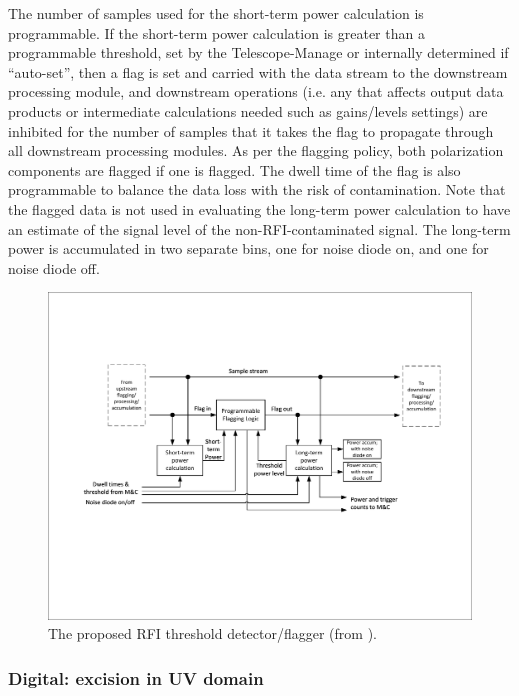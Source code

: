 The number of samples used for the short-term power calculation is programmable. If the short-term power calculation is greater than a programmable threshold, set by the Telescope-Manage or internally determined if ``auto-set'', then a flag is set and carried with the data stream to the downstream processing module, and downstream operations (i.e. any that affects output data products or intermediate calculations needed such as gains/levels settings) are inhibited for the number of samples that it takes the flag to propagate through all downstream processing modules. As per the flagging policy, both polarization components are flagged if one is flagged. The dwell time of the flag is also programmable to balance the data loss with the risk of contamination. Note that the flagged data is not used in evaluating the long-term power calculation to have an estimate of the signal level of the non-RFI-contaminated signal. The long-term power is accumulated in two separate bins, one for noise diode on, and one for noise diode off.

\begin{figure}
    \centering
    \includegraphics[height=.28\textheight]{figures/RFI_DF_SKA_Mid_CBF.pdf}
    \caption{The proposed RFI threshold detector/flagger (from \citep{ska_mid_cbf_rfi_2019}).}
    \label{fig:rfi_df_ska_mid_cbf}
\end{figure}


\subsubsection{Digital: excision in UV domain}

